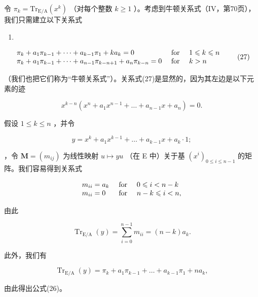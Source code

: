 令 \(\pi_k = \mathrm{Tr}_{\mathrm{E / A}}(x^k)\) （对每个整数 \(k \geqslant 1\) ）。考虑到牛顿关系式（IV，第70页），我们只需建立以下关系式

\begin{enumerate}
\def\labelenumi{(\arabic{enumi})}
\setcounter{enumi}{25}
\tightlist
\item
\end{enumerate}

\[
\begin{array}{l l} \pi_ {k} + a _ {1} \pi_ {k - 1} + \dots + a _ {k - 1} \pi_ {1} + k a _ {k} = 0 & \text { for } \quad 1 \leqslant k \leqslant n \\ \pi_ {k} + a _ {1} \pi_ {k - 1} + \dots + a _ {n - 1} \pi_ {k - n + 1} + a _ {n} \pi_ {k - n} = 0 & \text { for } \quad k > n \end{array}\tag{27}
\]

（我们也把它们称为“牛顿关系式”）。关系式(27)是显然的，因为其左边是以下元素的迹

\[
x ^ {k - n} \left(x ^ {n} + a _ {1} x ^ {n - 1} + \dots + a _ {n - 1} x + a _ {n}\right) = 0.
\]

假设 \(1 \leqslant k \leqslant n\) ，并令

\[
y = x ^ {k} + a _ {1} x ^ {k - 1} + \dots + a _ {k - 1} x + a _ {k} \cdot 1;
\]

，令 \(\mathbf{M} = (m_{ij})\) 为线性映射 \(u\mapsto yu\) （在 E 中）关于基 \((x^{i})_{0\leqslant i\leqslant n-1}\) 的矩阵。我们容易得到关系式

\[
\begin{array}{l l} m _ {i i} = a _ {k} & \text { for } \quad 0 \leqslant i <   n - k \\ m _ {i i} = 0 & \text { for } \quad n - k \leqslant i <   n, \end{array}
\]

由此

\[
\operatorname{Tr} _ {\mathrm{E/A}} (y) = \sum_ {i = 0} ^ {n - 1} m _ {i i} = (n - k) a _ {k}.
\]

此外，我们有

\[
\operatorname{Tr} _ {\mathrm{E/A}} (y) = \pi_ {k} + a _ {1} \pi_ {k - 1} + \dots + a _ {k - 1} \pi_ {1} + n a _ {k},
\]

由此得出公式(26)。

